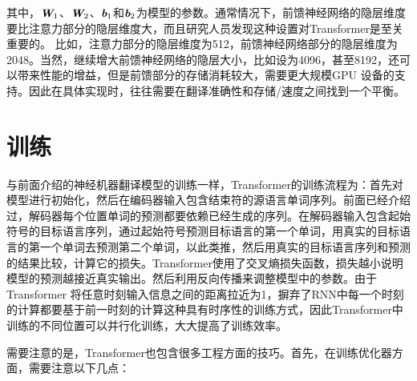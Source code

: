 \noindent 其中，$\textbf{\em W}_1$、$\textbf{\em W}_2$、$\textbf{\em b}_1$和$\textbf{\em b}_2$为模型的参数。通常情况下，前馈神经网络的隐层维度要比注意力部分的隐层维度大，而且研究人员发现这种设置对Transformer是至关重要的。 比如，注意力部分的隐层维度为512，前馈神经网络部分的隐层维度为2048。当然，继续增大前馈神经网络的隐层大小，比如设为4096，甚至8192，还可以带来性能的增益，但是前馈部分的存储消耗较大，需要更大规模GPU 设备的支持。因此在具体实现时，往往需要在翻译准确性和存储/速度之间找到一个平衡。


\section{训练}

\parinterval 与前面介绍的神经机器翻译模型的训练一样，Transformer的训练流程为：首先对模型进行初始化，然后在编码器输入包含结束符的源语言单词序列。前面已经介绍过，解码器每个位置单词的预测都要依赖已经生成的序列。在解码器输入包含起始符号的目标语言序列，通过起始符号预测目标语言的第一个单词，用真实的目标语言的第一个单词去预测第二个单词，以此类推，然后用真实的目标语言序列和预测的结果比较，计算它的损失。Transformer使用了交叉熵损失函数，损失越小说明模型的预测越接近真实输出。然后利用反向传播来调整模型中的参数。由于Transformer 将任意时刻输入信息之间的距离拉近为1，摒弃了RNN中每一个时刻的计算都要基于前一时刻的计算这种具有时序性的训练方式，因此Transformer中训练的不同位置可以并行化训练，大大提高了训练效率。

%

\parinterval 需要注意的是，Transformer也包含很多工程方面的技巧。首先，在训练优化器方面，需要注意以下几点：

